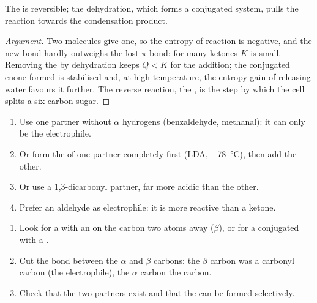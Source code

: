 \begin{proposition}\label{prop:b2:enolates-aldol:aldol-equilibrium}
The  is reversible; the dehydration, which forms a conjugated system, pulls the
reaction towards the condensation product.
\end{proposition}

\begin{proof}[Argument]
Two molecules give one, so the entropy of reaction is negative, and the new  bond hardly
outweighs the lost  $\pi$ bond: for many ketones $K$ is small. Removing the  by dehydration
keeps $Q < K$ for the addition; the conjugated enone formed is stabilised and, at high temperature,
the entropy gain of releasing water favours it further. The reverse reaction, the , is the
step by which the cell splits a six-carbon sugar.
\end{proof}

\begin{method}\label{met:b2:enolates-aldol:crossed-aldol}
\begin{enumerate}
  \item Use one partner without $\alpha$ hydrogens (benzaldehyde, methanal): it can only be the
        electrophile.
  \item Or form the  of one partner completely first (LDA, \qty{-78}{\degreeCelsius}), then add
        the other.
  \item Or use a 1,3-dicarbonyl partner, far more acidic than the other.
  \item Prefer an aldehyde as electrophile: it is more reactive than a ketone.
\end{enumerate}
\end{method}

\begin{method}\label{met:b2:enolates-aldol:aldol-recognition}
\begin{enumerate}
  \item Look for a  with an  on the carbon two atoms away ($\beta$), or for a 
        conjugated with a .
  \item Cut the bond between the $\alpha$ and $\beta$ carbons: the $\beta$ carbon was a carbonyl carbon (the
        electrophile), the $\alpha$ carbon the  carbon.
  \item Check that the two partners exist and that the  can be formed selectively.
\end{enumerate}
\end{method}

